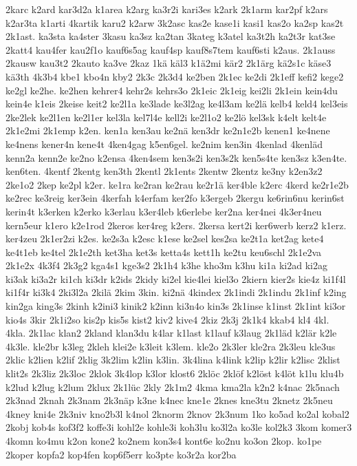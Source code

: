 {2karc
k2ard
kar3d2a
k1area
k2arg
ka3r2i
kari3es
k2ark
2k1arm
kar2pf
k2ars
k2ar3ta
k1arti
4kartik
karu2
k2arw
3k2asc
kas2e
kase1i
kasi1
kas2o
ka2sp
kas2t
2k1ast.
ka3sta
ka4ster
3kasu
ka3sz
ka2tan
3kateg
k3atel
ka3t2h
ka2t3r
kat3se
2katt4
kau4fer
kau2f1o
kauf6s5ag
kauf4sp
kauf8s7tem
kauf6sti
k2aus.
2k1auss
2kausw
kau3t2
2kauto
ka3ve
2kaz
1kä
käl3
k1ä2mi
kär2
2k1ärg
kä2s1c
käse3
kä3th
4k3b4
kbe1
kbo4n
kby2
2k3c
2k3d4
ke2ben
2k1ec
ke2di
2k1eff
kefi2
kege2
ke2gl
ke2he.
ke2hen
kehrer4
kehr2s
kehrs3o
2k1eic
2k1eig
kei2li
2k1ein
kein4du
kein4e
k1eis
2keise
keit2
ke2l1a
ke3lade
ke3l2ag
ke4l3am
ke2lä
kelb4
keld4
kel3eis
2ke2lek
ke2l1en
ke2l1er
kel3la
kel7l4e
kell2i
ke2l1o2
ke2lö
kel3sk
k4elt
kelt4e
2k1e2mi
2k1emp
k2en.
ken1a
ken3au
ke2nä
ken3dr
ke2n1e2b
kenen1
ke4nene
ke4nens
kener4n
kene4t
4ken4gag
k5en6gel.
ke2nim
ken3in
4kenlad
4kenläd
kenn2a
kenn2e
ke2no
k2ensa
4ken4sem
ken3s2i
ken3s2k
ken5s4te
ken3sz
k3en4te.
ken6ten.
4kentf
2kentg
ken3th
2kentl
2k1ents
2kentw
2kentz
ke3ny
k2en3z2
2ke1o2
2kep
ke2pl
k2er.
ke1ra
ke2ran
ke2rau
ke2r1ä
ker4ble
k2erc
4kerd
ke2r1e2b
ke2rec
ke3reig
ker3ein
4kerfah
k4erfam
ker2fo
k3ergeb
2kergu
ke6rin6nu
kerin6st
kerin4t
k3erken
k2erko
k3erlau
k3er4leb
k6erlebe
ker2na
ker4nei
4k3er4neu
kern5eur
k1ero
k2e1rod
2keros
ker4reg
k2ers.
2kersa
kert2i
ker6werb
kerz2
k1erz.
ker4zeu
2k1er2zi
k2es.
ke2s3a
k2esc
k1ese
ke2sel
kes2sa
ke2t1a
ket2ag
kete4
ke4t1eb
ke4tel
2k1e2th
ket3ha
ket3s
ketta4s
kett1h
ke2tu
keu6schl
2k1e2va
2k1e2x
4k3f4
2k3g2
kga4s1
kge3s2
2k1h4
k3he
kho3m
k3hu
ki1a
ki2ad
ki2ag
ki3ak
ki3a2r
ki1ch
ki3dr
k2ids
2kidy
ki2el
kie4lei
kiel3o
2kiern
kier2s
kie4z
ki1f4l
ki1f4r
ki3k4
2ki3l2a
2kilä
2kim
3kin.
ki2nä
4kindex
2k1indi
2k1indu
2k1inf
k2ing
kin2ga
king3s
2kinh
k2ini3
kinik2
k2inn
ki3n4o
kin3s
2k1inse
k1inst
2k1int
ki3or
kio4s
3kir
2k1i2so
kis2p
kis5s
kist2
kiv2
kive4
2kiz
2k3j
2k1k4
kkab4
kl4
4kl.
4kla.
2k1lac
klan2
2kland
klan3du
k4lar
k1last
k1lauf
k3laug
2k1läd
k2lär
k2le
4k3le.
kle2br
k3leg
2kleh
klei2e
k3leit
k3lem.
kle2o
2k3ler
kle2ra
2k3leu
kle3us
2klic
k2lien
k2lif
2klig
3k2lim
k2lin
k3lin.
3k4lina
k4link
k2lip
k2lir
k2lisc
2klist
klit2s
2k3liz
2k3loc
2klok
3k4lop
k3lor
klost6
2klöc
2klöf
k2löst
k4löt
k1lu
klu4b
k2lud
k2lug
k2lum
2klux
2k1lüc
2kly
2k1m2
4kma
kma2la
k2n2
k4nac
2k5nach
2k3nad
2knah
2k3nam
2k3näp
k3ne
k4nec
kne1e
2knes
kne3tu
2knetz
2k5neu
4kney
kni4e
2k3niv
kno2b3l
k4nol
2knorm
2knov
2k3num
1ko
ko5ad
ko2al
kobal2
2kobj
kob4s
kof3f2
koffe3i
kohl2e
kohle3i
koh3lu
ko3l2a
ko3le
kol2k3
3kom
komer3
4komn
ko4mu
k2on
kone2
ko2nem
kon3s4
kont6e
ko2nu
ko3on
2kop.
ko1pe
2koper
kopfa2
kop4fen
kop6f5err
ko3pte
ko3r2a
kor2ba
}
